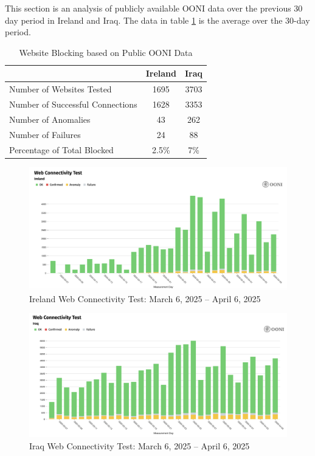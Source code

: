 This section is an analysis of publicly available OONI data over the previous 30 day period in Ireland and Iraq. The data in table \ref{tab:category_block} is the average over the 30-day period.

\vspace{2em}

\begin{table}[H]
\centering
\caption{Website Blocking based on Public OONI Data}
\begin{tabular}{lcc}
\toprule
\textbf{} & \textbf{Ireland} & \textbf{Iraq} \\
\midrule
Number of Websites Tested           & 1695 & 3703 \\
Number of Successful Connections    & 1628 & 3353 \\
Number of Anomalies                 & 43 & 262 \\
Number of Failures                  & 24 & 88 \\
\bottomrule
Percentage of Total Blocked         & 2.5\% & 7\% \\
\end{tabular}
\label{tab:category_block}
\end{table}

\begin{figure}[H]
    \centering
    \includegraphics[width=\textwidth]{Griff/TCD SCSS CAPSTONE/Results/IrelandWebsiteTest.png}
    \caption{Ireland Web Connectivity Test: March 6, 2025 -- April 6, 2025}
    \label{fig:iraq-middlebox-HTTP-manipulation}
\end{figure}

\begin{figure}[H]
    \centering
    \includegraphics[width=\textwidth]{Griff/TCD SCSS CAPSTONE/Results/IraqWebsiteTest.png}
    \caption{Iraq Web Connectivity Test: March 6, 2025 -- April 6, 2025}
    \label{fig:iraq-middlebox-HTTP-manipulation}
\end{figure}

